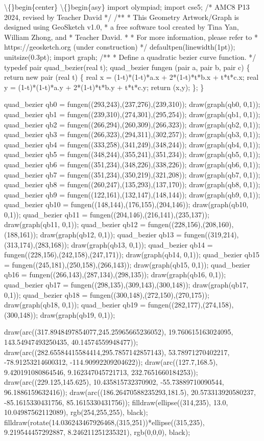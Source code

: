 \documentclass{article}
\begin{document}
\begin{enumerate}[label=\arabic*., itemsep=0.5em]
\textbackslash\{\}begin\{center\}
\textbackslash\{\}begin\{asy\}
import olympiad;
import cse5;
/* AMC8 P13 2024, revised by Teacher David */
/**
 * This Geometry Artwork/Graph is designed using GeoSketch v1.0, 
 * a free software tool created by Tina Yan, William Zhong, and 
 * Teacher David.
 *
 * For more information, please refer to
 *   https://geosketch.org (under construction)
 */
defaultpen(linewidth(1pt));
unitsize(0.3pt);
import graph;
/**
 * Define a quadratic bezier curve function.
 */
typedef pair quad\_bezier(real t);
quad\_bezier fungen (pair a, pair b, pair c) \{
  return new pair (real t) \{
    real x = (1-t)*(1-t)*a.x + 2*(1-t)*t*b.x + t*t*c.x;
    real y = (1-t)*(1-t)*a.y + 2*(1-t)*t*b.y + t*t*c.y;
    return (x,y);
  \};
\}

quad\_bezier qb0 = fungen((293,243),(237,276),(239,310));
draw(graph(qb0, 0,1));
quad\_bezier qb1 = fungen((239,310),(274,301),(295,254));
draw(graph(qb1, 0,1));
quad\_bezier qb2 = fungen((266,294),(260,309),(266,323));
draw(graph(qb2, 0,1));
quad\_bezier qb3 = fungen((266,323),(294,311),(302,257));
draw(graph(qb3, 0,1));
quad\_bezier qb4 = fungen((333,258),(341,249),(348,244));
draw(graph(qb4, 0,1));
quad\_bezier qb5 = fungen((348,244),(355,241),(351,234));
draw(graph(qb5, 0,1));
quad\_bezier qb6 = fungen((351,234),(348,226),(338,226));
draw(graph(qb6, 0,1));
quad\_bezier qb7 = fungen((351,234),(350,219),(321,208));
draw(graph(qb7, 0,1));
quad\_bezier qb8 = fungen((260,247),(135,293),(137,170));
draw(graph(qb8, 0,1));
quad\_bezier qb9 = fungen((122,161),(132,147),(148,144));
draw(graph(qb9, 0,1));
quad\_bezier qb10 = fungen((148,144),(176,155),(204,146));
draw(graph(qb10, 0,1));
quad\_bezier qb11 = fungen((204,146),(216,141),(235,137));
draw(graph(qb11, 0,1));
quad\_bezier qb12 = fungen((228,156),(208,160),(188,161));
draw(graph(qb12, 0,1));
quad\_bezier qb13 = fungen((319,214),(313,174),(283,168));
draw(graph(qb13, 0,1));
quad\_bezier qb14 = fungen((228,156),(242,158),(247,171));
draw(graph(qb14, 0,1));
quad\_bezier qb15 = fungen((245,181),(250,158),(266,143));
draw(graph(qb15, 0,1));
quad\_bezier qb16 = fungen((266,143),(287,134),(298,135));
draw(graph(qb16, 0,1));
quad\_bezier qb17 = fungen((298,135),(309,143),(300,148));
draw(graph(qb17, 0,1));
quad\_bezier qb18 = fungen((300,148),(272,150),(270,175));
draw(graph(qb18, 0,1));
quad\_bezier qb19 = fungen((282,177),(274,158),(300,148));
draw(graph(qb19, 0,1));

draw(arc((317.8948497854077,245.25965665236052), 19.760615163024095, 143.54947493250435, 40.14574559948477));
draw(arc((282.65584415584414,295.7857142857143), 53.78971270402217, -78.91253214600312, -114.90992209204622));
draw(arc((127.7,168.5), 9.420191080864546, 9.162347045721713, 232.7651660184253));
draw(arc((229.125,145.625), 10.435815732370902, -55.73889710090544, 96.1886159632416));
draw(arc((186.26470588235293,181.5), 20.573313920580237, -85.1615330431756, 85.1615330431756));
filldraw(ellipse((314,235), 13.0, 10.04987562112089), rgb(254,255,255), black);
filldraw(rotate(14.036243467926468,(315,251))*ellipse((315,235), 9.219544457292887, 8.246211251235321),
	rgb(0,0,0), black);


\end{enumerate}
\end{document}
